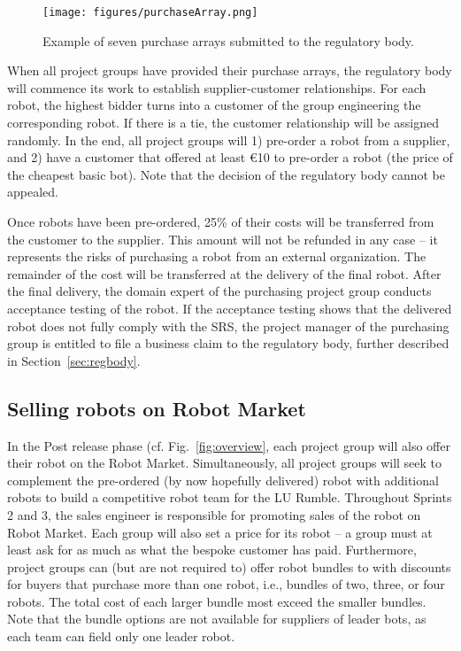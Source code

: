 \documentclass{scrreprt}
\begin{document}
\begin{figure}
\centering
\texttt{[image: figures/purchaseArray.png]}
\caption{Example of seven purchase arrays submitted to the regulatory body.}
\label{fig:array}
\end{figure}

When all project groups have provided their purchase arrays, the regulatory body will commence its work to establish supplier-customer relationships. For each robot, the highest bidder turns into a customer of the group engineering the corresponding robot. If there is a tie, the customer relationship will be assigned randomly. In the end, all project groups will 1) pre-order a robot from a supplier, and 2) have a customer that offered at least \euro 10 to pre-order a robot (the price of the cheapest basic bot). Note that the decision of the regulatory body cannot be appealed. 

Once robots have been pre-ordered, 25\% of their costs will be transferred from the customer to the supplier. This amount will not be refunded in any case -- it represents the risks of purchasing a robot from an external organization. The remainder of the cost will be transferred at the delivery of the final robot. After the final delivery, the domain expert of the purchasing project group conducts acceptance testing of the robot. If the acceptance testing shows that the delivered robot does not fully comply with the SRS, the project manager of the purchasing group is entitled to file a business claim to the regulatory body, further described in Section~\ref{sec:regbody}.

\subsection{Selling robots on Robot Market}
In the Post release phase (cf. Fig.~\ref{fig:overview}, each project group will also offer their robot on the Robot Market. Simultaneously, all project groups will seek to complement the pre-ordered (by now hopefully delivered) robot with additional robots to build a competitive robot team for the LU Rumble. Throughout Sprints 2 and 3, the sales engineer is responsible for promoting sales of the robot on Robot Market. Each group will also set a price for its robot -- a group must at least ask for as much as what the bespoke customer has paid. Furthermore, project groups can (but are not required to) offer robot bundles to with discounts for buyers that purchase more than one robot, i.e., bundles of two, three, or four robots. The total cost of each larger bundle most exceed the smaller bundles. Note that the bundle options are not available for suppliers of leader bots, as each team can field only one leader robot. 
\end{document}
